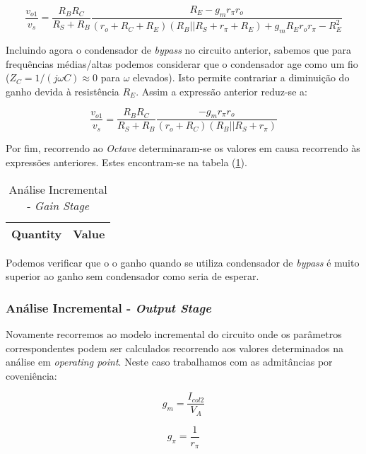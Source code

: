 \begin{equation}
  \frac{v_{o1}}{v_{s}} = \frac{R_B R_C}{R_S + R_B} \frac{R_E - g_m r_{\pi} r_o}{(r_o + R_C + R_E)(R_B || R_S + r_{\pi} + R_E) + g_m R_E r_o r_{\pi} - R_E^2}
\end{equation}

Incluindo agora o condensador de \emph{bypass} no circuito anterior, sabemos que para frequências médias/altas 
podemos considerar que o condensador age como um fio ($Z_C = 1/(j \omega C) \approx 0$ para $\omega$ elevados). Isto permite contrariar a 
diminuição do ganho devida à resistência $R_E$. Assim a expressão anterior reduz-se a:

\begin{equation}
  \frac{v_{o1}}{v_{s}} = \frac{R_B R_C}{R_S + R_B} \frac{- g_m r_{\pi} r_o}{(r_o + R_C)(R_B || R_S + r_{\pi})}
\end{equation}

Por fim, recorrendo ao \emph{Octave} determinaram-se os valores em causa recorrendo às expressões anteriores. Estes encontram-se na tabela (\ref{tab:Teo-AC-Gain-Stage}).

\begin{table}[H]
    \centering
    \begin{tabular}{|l|r|}
    \hline    
    {\bf Quantity} & {\bf Value} \\ \hline
    
    \end{tabular}
    \caption{Análise Incremental - \emph{Gain Stage}}
    \label{tab:Teo-AC-Gain-Stage}
\end{table}

Podemos verificar que o o ganho quando se utiliza condensador de \emph{bypass} é muito superior ao ganho sem condensador como seria de esperar.

\subsubsection{Análise Incremental - \emph{Output Stage}}

Novamente recorremos ao modelo incremental do circuito onde os parâmetros correspondentes podem ser calculados 
recorrendo aos valores determinados na análise em \emph{operating point}.
Neste caso trabalhamos com as admitâncias por coveniência:

\begin{equation}
  g_{m} = \frac{I_{col2}}{V_A}
\end{equation}

\begin{equation}
  g_{\pi} = \frac{1}{r_{\pi}}
\end{equation}

